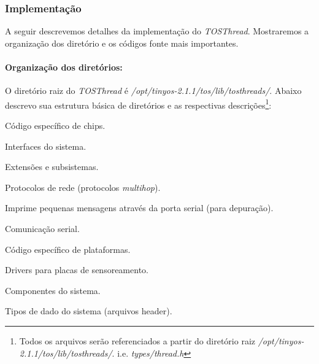 \documentclass[a4paper, 10pt]{article}
\begin{document}

\subsubsection{Implementação}
A seguir descrevemos detalhes da implementação do \textit{TOSThread}. Mostraremos a organização dos diretório e os
códigos fonte mais importantes.

\paragraph{Organização dos diretórios:}
O diretório raiz do \textit{TOSThread} é \textit{/opt/tinyos-2.1.1/tos/lib/tosthreads/}.
Abaixo descrevo sua estrutura básica de diretórios e as respectivas descrições\footnote{Todos os arquivos serão referenciados a partir do diretório
raiz \textit{/opt/tinyos-2.1.1/tos/lib/tosthreads/}. i.e. \textit{types/thread.h}}:
\begin{description}
\setlength{\itemsep}{0.2pt}
\setlength{\parskip}{0pt}
\setlength{\parsep}{0pt}
    \item[chips:] Código específico de chips.
    \item[interfaces:] Interfaces do sistema.
    \item[lib:] Extensões e subsistemas.
        \begin{description}
        \setlength{\itemsep}{0.2pt}
        \setlength{\parskip}{0pt}
        \setlength{\parsep}{0pt}
            \item[net:] Protocolos de rede (protocolos \textit{multihop}).
            \item[printf:] Imprime pequenas mensagens através da porta serial (para depuração).
            \item[serial:] Comunicação serial.
        \end{description}
    \item[platforms:] Código específico de plataformas.
    \item[sensorboards:] Drivers para placas de sensoreamento.
    \item[system:] Componentes do sistema.
    \item[types:] Tipos de dado do sistema (arquivos header).
\end{description}
\end{document}
